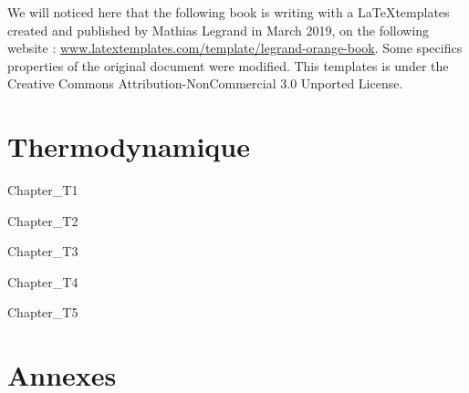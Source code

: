 \documentclass[11pt,fleqn]{book} %
\begin{document}
\noindent We will noticed here that the following book is writing with a \LaTeX  templates created and published by Mathias Legrand in March 2019, on the following website : \url{www.latextemplates.com/template/legrand-orange-book}. Some specifics properties of the original document were modified. This templates is under the Creative Commons Attribution-NonCommercial 3.0 Unported License.




\pagestyle{empty} %

\tableofcontents %

\cleardoublepage %

\pagestyle{fancy} %




\part{Thermodynamique}

{Chapter_T1}


{Chapter_T2}


{Chapter_T3}


{Chapter_T4}


{Chapter_T5}

\appendix
\part{Annexes}
\end{document}
